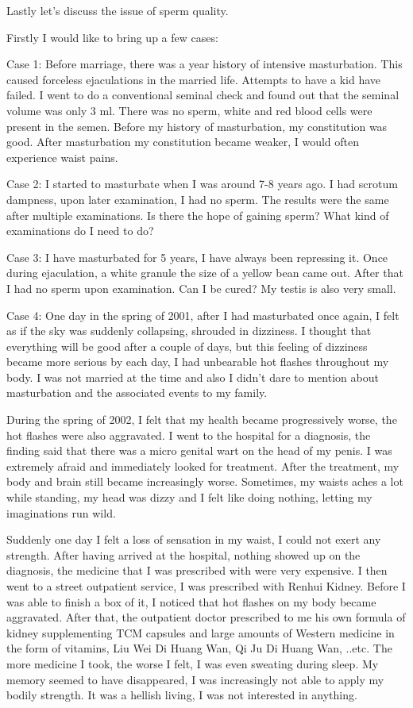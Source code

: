 \documentclass[
]{book}
\begin{document}
Lastly let's discuss the issue of sperm quality.

Firstly I would like to bring up a few cases:

Case 1: Before marriage, there was a year history of intensive masturbation. This caused forceless ejaculations in the married life. Attempts to have a kid have failed. I went to do a conventional seminal check and found out that the seminal volume was only 3 ml. There was no sperm, white and red blood cells were present in the semen. Before my history of masturbation, my constitution was good. After masturbation my constitution became weaker, I would often experience waist pains.

Case 2: I started to masturbate when I was around 7-8 years ago. I had scrotum dampness, upon later examination, I had no sperm. The results were the same after multiple examinations. Is there the hope of gaining sperm? What kind of examinations do I need to do?

Case 3: I have masturbated for 5 years, I have always been repressing it. Once during ejaculation, a white granule the size of a yellow bean came out. After that I had no sperm upon examination. Can I be cured? My testis is also very small.

Case 4: One day in the spring of 2001, after I had masturbated once again, I felt as if the sky was suddenly collapsing, shrouded in dizziness. I thought that everything will be good after a couple of days, but this feeling of dizziness became more serious by each day, I had unbearable hot flashes throughout my body. I was not married at the time and also I didn't dare to mention about masturbation and the associated events to my family.

During the spring of 2002, I felt that my health became progressively worse, the hot flashes were also aggravated. I went to the hospital for a diagnosis, the finding said that there was a micro genital wart on the head of my penis. I was extremely afraid and immediately looked for treatment. After the treatment, my body and brain still became increasingly worse. Sometimes, my waists aches a lot while standing, my head was dizzy and I felt like doing nothing, letting my imaginations run wild.

Suddenly one day I felt a loss of sensation in my waist, I could not exert any strength. After having arrived at the hospital, nothing showed up on the diagnosis, the medicine that I was prescribed with were very expensive. I then went to a street outpatient service, I was prescribed with Renhui Kidney. Before I was able to finish a box of it, I noticed that hot flashes on my body became aggravated. After that, the outpatient doctor prescribed to me his own formula of kidney supplementing TCM capsules and large amounts of Western medicine in the form of vitamins, Liu Wei Di Huang Wan, Qi Ju Di Huang Wan, ..etc. The more medicine I took, the worse I felt, I was even sweating during sleep. My memory seemed to have disappeared, I was increasingly not able to apply my bodily strength. It was a hellish living, I was not interested in anything.
\end{document}

